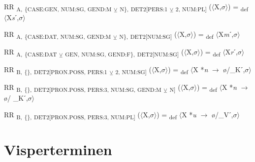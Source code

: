 {\begin{exe}
 RR \textsubscript{A,} \textsubscript{\{CASE:GEN, NUM:SG, GEND:M} \textsubscript{${\veebar}$}\textsubscript{ N\},} \textsubscript{DET2[PERS:1} \textsubscript{${\veebar}$}\textsubscript{ 2, NUM:PL]}  ($\langle$X,$\sigma $$\rangle$) = \textsubscript{def} $\langle$X\textit{s}ˊ,$\sigma $$\rangle$
\end{exe}

\begin{exe}
 RR \textsubscript{A,} \textsubscript{\{CASE:DAT, NUM:SG, GEND:M} \textsubscript{${\veebar}$}\textsubscript{ N\},} \textsubscript{DET2[NUM:SG]}  ($\langle$X,$\sigma $$\rangle$) = \textsubscript{def} $\langle$X\textit{m}ˊ,$\sigma $$\rangle$
\end{exe}

\begin{exe}
 RR \textsubscript{A,} \textsubscript{\{CASE:DAT} \textsubscript{${\veebar}$}\textsubscript{ GEN, NUM:SG, GEND:F\},} \textsubscript{DET2[NUM:SG]}  ($\langle$X,$\sigma $$\rangle$) = \textsubscript{def} $\langle$X\textit{r}ˊ,$\sigma $$\rangle$
\end{exe}

\begin{exe}
 RR \textsubscript{B,} \textsubscript{\{\},} \textsubscript{DET2[PRON.POSS, PERS:1} \textsubscript{${\veebar}$}\textsubscript{ 2, NUM:SG]}  ($\langle$X,$\sigma $$\rangle$) = \textsubscript{def} $\langle$X *\textit{n} $\rightarrow$ ø/\_Kˊ,$\sigma $$\rangle$
\end{exe}

\begin{exe}
 RR \textsubscript{B,} \textsubscript{\{\},} \textsubscript{DET2[PRON.POSS, PERS:3, NUM:SG, GEND:M} \textsubscript{${\veebar}$}\textsubscript{ N]}  ($\langle$X,$\sigma $$\rangle$) = \textsubscript{def} $\langle$X *\textit{n} $\rightarrow$ ø/ \_Kˊ,$\sigma $$\rangle$
\end{exe}

\begin{exe}
 RR \textsubscript{B,} \textsubscript{\{\},} \textsubscript{DET2[PRON.POSS, PERS:3, NUM:PL]}  ($\langle$X,$\sigma $$\rangle$) = \textsubscript{def} $\langle$X *\textit{u} $\rightarrow$ ø/\_Vˊ,$\sigma $$\rangle$
\end{exe}

\section{Visperterminen}

}
